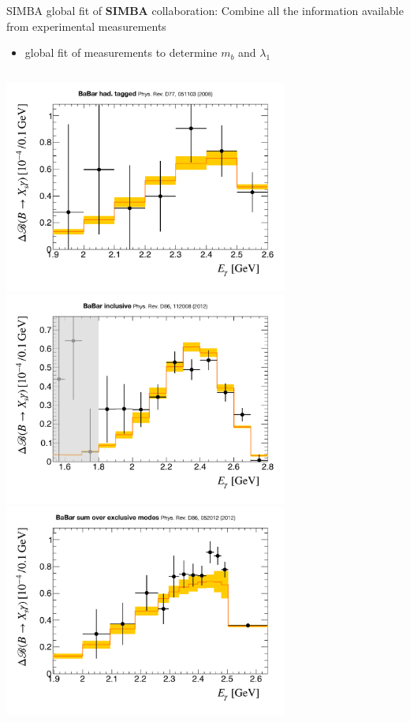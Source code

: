 \documentclass[xcolor=dvipsnames]{beamer}
\begin{document}
   \begin{frame}{SIMBA global fit of \BtoXsgamma}
      \small
      \textbf{SIMBA} collaboration: 
      Combine all the information available from experimental measurements
      \begin{itemize}
       \item[\ra] global fit of \BtoXsgamma measurements to determine $m_b$ and $\lambda_1$
      \end{itemize}

      \begin{columns}
         \centering
         \includegraphics[width=0.7\textwidth]{figures/babar_hadtag_spec_default_la055_a3.pdf}
         \includegraphics[width=0.7\textwidth]{figures/babar_incl_spec_default_la055_a3.pdf}
         \includegraphics[width=0.7\textwidth]{figures/babar_sem_spec_default_la055_a3.pdf}

\end{columns}
\end{frame}
\end{document}
